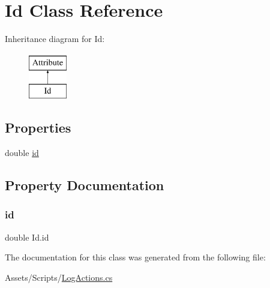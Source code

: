 \hypertarget{classId}{}\section{Id Class Reference}
\label{classId}
Inheritance diagram for Id\+:\begin{figure}[H]
\begin{center}
\leavevmode
\includegraphics[height=2.000000cm]{classId}
\end{center}
\end{figure}
\subsection*{Properties}
\begin{DoxyCompactItemize}
\item 
double \hyperlink{classId_a3207637bf5e9e541329b6568a26a159a}{id}
\end{DoxyCompactItemize}


\subsection{Property Documentation}
\mbox{\label{classId_a3207637bf5e9e541329b6568a26a159a}} 
\subsubsection{\texorpdfstring{id}{id}}
{\footnotesize\ttfamily double Id.\+id\hspace{0.3cm}{\ttfamily [get]}}



The documentation for this class was generated from the following file\+:\begin{DoxyCompactItemize}
\item 
Assets/\+Scripts/\hyperlink{LogActions_8cs}{Log\+Actions.\+cs}\end{DoxyCompactItemize}
